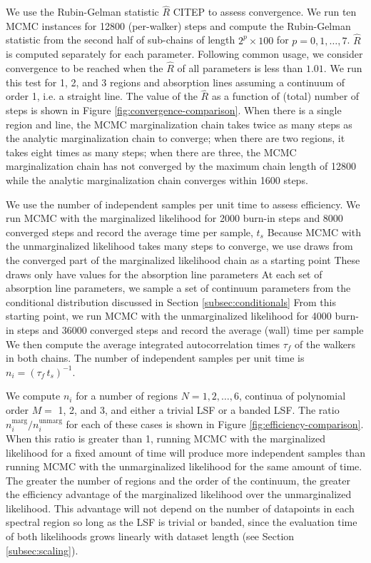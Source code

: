 \documentclass[manuscript]{aastex62}
\begin{document}
We use the Rubin-Gelman statistic $\hat{R}$ CITEP to assess convergence.
We run ten MCMC instances for 12800 (per-walker) steps and compute the Rubin-Gelman statistic from the second half of sub-chains of length $2^p \times 100$ for $p=0, 1, \ldots, 7$.
$\hat{R}$ is computed separately for each parameter.
Following common usage, we consider convergence to be reached when the $\hat{R}$ of all parameters is less than $1.01$.
We run this test for 1, 2, and 3 regions and absorption lines assuming a continuum of order 1, i.e. a straight line.
The value of the $\hat{R}$ as a function of (total) number of steps is shown in Figure \ref{fig:convergence-comparison}.
When there is a single region and line, the MCMC marginalization chain takes twice as many steps as the analytic marginalization chain to converge; when there are two regions, it takes eight times as many steps; when there are three, the MCMC marginalization chain has not converged by the maximum chain length of 12800 while the analytic marginalization chain converges within 1600 steps.

We use the number of independent samples per unit time to assess efficiency.
We run MCMC with the marginalized likelihood for 2000 burn-in steps and 8000 converged steps and record the average time per sample, $t_s$
Because MCMC with the unmarginalized likelihood takes many steps to converge, we use draws from the converged part of the marginalized likelihood chain as a starting point
These draws only have values for the absorption line parameters
At each set of absorption line parameters, we sample a set of continuum parameters from the conditional distribution discussed in Section \ref{subsec:conditionals}
From this starting point, we run MCMC with the unmarginalized likelihood for 4000 burn-in steps and 36000 converged steps and record the average (wall) time per sample
We then compute the average integrated autocorrelation times $\tau_f$ of the walkers in both chains.
The number of independent samples per unit time is $n_i = \left(\tau_f \, t_s \right)^{-1}$.

We compute $n_i$ for a number of regions $N = 1, 2, \ldots, 6$, continua of polynomial order $M=$ 1, 2, and 3, and either a trivial LSF or a banded LSF.
The ratio $n_i^{\text{marg}} / n_i^{\text{unmarg}}$ for each of these cases is shown in Figure \ref{fig:efficiency-comparison}.
When this ratio is greater than 1, running MCMC with the marginalized likelihood for a fixed amount of time will produce more independent samples than running MCMC with the unmarginalized likelihood for the same amount of time.
The greater the number of regions and the order of the continuum, the greater the efficiency advantage of the marginalized likelihood over the unmarginalized likelihood.
This advantage will not depend on the number of datapoints in each spectral region so long as the LSF is trivial or banded, since the evaluation time of both likelihoods grows linearly with dataset length (see Section \ref{subsec:scaling}).
\end{document}
